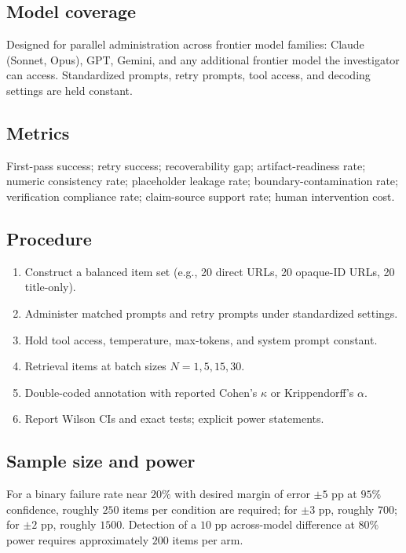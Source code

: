 \documentclass[11pt]{article}
\begin{document}
\subsection{Model coverage}
Designed for parallel administration across frontier model families: Claude (Sonnet, Opus), GPT, Gemini, and any additional frontier model the investigator can access. Standardized prompts, retry prompts, tool access, and decoding settings are held constant.

\subsection{Metrics}
First-pass success; retry success; recoverability gap; artifact-readiness rate; numeric consistency rate; placeholder leakage rate; boundary-contamination rate; verification compliance rate; claim-source support rate; human intervention cost.

\subsection{Procedure}
\begin{enumerate}[leftmargin=*, label=\arabic*.]
  \item Construct a balanced item set (e.g., 20 direct URLs, 20 opaque-ID URLs, 20 title-only).
  \item Administer matched prompts and retry prompts under standardized settings.
  \item Hold tool access, temperature, max-tokens, and system prompt constant.
  \item Retrieval items at batch sizes $N=1,5,15,30$.
  \item Double-coded annotation with reported Cohen's $\kappa$ or Krippendorff's $\alpha$.
  \item Report Wilson CIs and exact tests; explicit power statements.
\end{enumerate}

\subsection{Sample size and power}
For a binary failure rate near $20\%$ with desired margin of error $\pm 5$ pp at $95\%$ confidence, roughly $250$ items per condition are required; for $\pm 3$ pp, roughly $700$; for $\pm 2$ pp, roughly $1500$. Detection of a $10$ pp across-model difference at $80\%$ power requires approximately $200$ items per arm.
\end{document}
